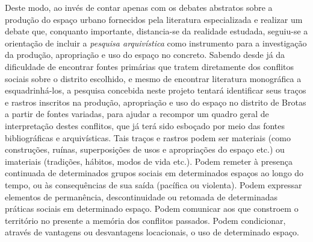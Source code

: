 Deste modo, ao invés de contar apenas com os debates abstratos sobre a produção do espaço urbano fornecidos pela literatura especializada e realizar um debate que, conquanto importante, distancia-se da realidade estudada, seguiu-se a orientação de incluir a \textit{pesquisa arquivística} como instrumento para a investigação da produção, apropriação e uso do espaço no concreto. Sabendo desde já da dificuldade de encontrar fontes primárias que tratem diretamente dos conflitos sociais sobre o distrito escolhido, e mesmo de encontrar literatura monográfica a esquadrinhá-los, a pesquisa concebida neste projeto tentará identificar seus traços e rastros inscritos na produção, apropriação e uso do espaço no distrito de Brotas a partir de fontes variadas, para ajudar a recompor um quadro geral de interpretação destes conflitos, que já terá sido esboçado por meio das fontes bibliográficas e arquivísticas. Tais traços e rastros podem ser materiais (como construções, ruínas, superposições de usos e apropriações do espaço etc.) ou imateriais (tradições, hábitos, modos de vida etc.). Podem remeter à presença continuada de determinados grupos sociais em determinados espaços ao longo do tempo, ou às consequências de sua saída (pacífica ou violenta). Podem expressar elementos de permanência, descontinuidade ou retomada de determinadas práticas sociais em determinado espaço. Podem comunicar aos que constroem o território no presente a memória dos conflitos passados. Podem condicionar, através de vantagens ou desvantagens locacionais, o uso de determinado espaço. 




